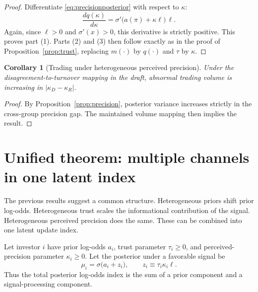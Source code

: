 \documentclass[12pt]{article}
\newtheorem{corollary}{Corollary}
\begin{document}
\begin{proof}
Differentiate \eqref{eq:precisionposterior} with respect to $\kappa$:
\[
    \frac{dq(\kappa)}{d\kappa}=\sigma'\!\big(a(\pi)+\kappa\ell\big)\,\ell.
\]
Again, since $\ell>0$ and $\sigma'(x)>0$, this derivative is strictly positive. This proves part (1). Parts (2) and (3) then follow exactly as in the proof of Proposition~\ref{prop:trust}, replacing $m(\cdot)$ by $q(\cdot)$ and $\tau$ by $\kappa$.
\end{proof}

\begin{corollary}[Trading under heterogeneous perceived precision]\label{cor:precisionvolume}
Under the disagreement-to-turnover mapping in the draft, abnormal trading volume is increasing in $|\kappa_D-\kappa_R|$.
\end{corollary}

\begin{proof}
By Proposition~\ref{prop:precision}, posterior variance increases strictly in the cross-group precision gap. The maintained volume mapping then implies the result.
\end{proof}

\section{Unified theorem: multiple channels in one latent index}

The previous results suggest a common structure. Heterogeneous priors shift prior log-odds. Heterogeneous trust scales the informational contribution of the signal. Heterogeneous perceived precision does the same. These can be combined into one latent update index.

Let investor $i$ have prior log-odds $a_i$, trust parameter $\tau_i\ge 0$, and perceived-precision parameter $\kappa_i\ge 0$. Let the posterior under a favorable signal be
\begin{equation}\label{eq:unified}
    \mu_i=\sigma\!\big(a_i+z_i\big),
    \qquad z_i\equiv \tau_i\kappa_i\ell.
\end{equation}
Thus the total posterior log-odds index is the sum of a prior component and a signal-processing component.
\end{document}

